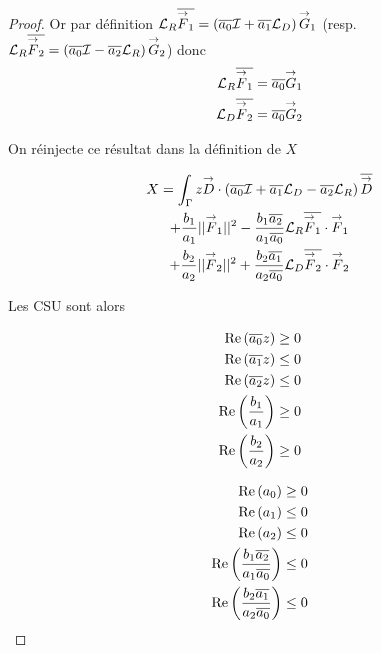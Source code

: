 \begin{proof}

    Or par définition \(\LR\conj{\vF_1} = \left(\conj{a_0} \oI + \conj{a_1} \LD \right)\vG_1\) (resp. \(\LR\conj{\vF_2} = \left(\conj{a_0} \oI - \conj{a_2} \LR \right)\vG_2\)) donc
    \begin{align}
      \LR\conj{\vF_1} &= \conj{a_0}\vG_1
      \\
      \LD\conj{\vF_2} &= \conj{a_0}\vG_2
    \end{align}

    On réinjecte ce résultat dans la définition de \(X\)

    \begin{multline}
      X = \int_\Gamma z \vD \cdot \left(\conj{a_0} \oI + \conj{a_1} \LD - \conj{a_2}\LR\right)\conj{\vD}
      \\
      + \frac{b_1}{a_1} ||\vF_1||^2 - \frac{b_1\conj{a_2}}{a_1\conj{a_0}} \LR\conj{\vF_1}\cdot\vF_1
      \\
      + \frac{b_2}{a_2} ||\vF_2||^2 + \frac{b_2\conj{a_1}}{a_2\conj{a_0}} \LD\conj{\vF_2}\cdot\vF_2
    \end{multline}

    Les CSU sont alors

    \begin{minipage}{0.5\textwidth}
    \begin{align}
      \Re\left(\conj{a_0}z\right) \ge 0
      \\
      \Re\left(\conj{a_1}z\right) \le 0
      \\
      \Re\left(\conj{a_2}z\right) \le 0
      \\
      \Re\left(\frac{b_1}{a_1}\right) \ge 0
      \\
      \Re\left(\frac{b_2}{a_2}\right) \ge 0
    \end{align}
    \end{minipage}
    \begin{minipage}{0.49\textwidth}
    \begin{align}
      \Re\left(a_0\right) \ge 0
      \\
      \Re\left(a_1\right) \le 0
      \\
      \Re\left(a_2\right) \le 0
      \\
      \Re\left(\frac{b_1\conj{a_2}}{a_1\conj{a_0}}\right) \le 0
      \\
      \Re\left(\frac{b_2\conj{a_1}}{a_2\conj{a_0}}\right) \le 0
    \end{align}
    \end{minipage}
  \end{proof}